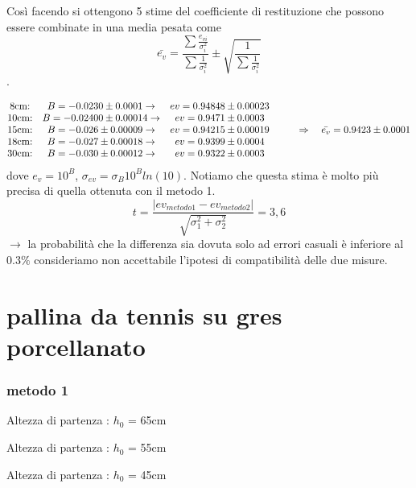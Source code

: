 \documentclass[a4paper]{article}
\theoremstyle{definition}
\begin{document}
	\noindent Così facendo si ottengono 5 stime del coefficiente di restituzione che possono essere combinate in una media pesata come \[\bar{e_{v}}=\frac{\sum\frac{e_{vi}}{\sigma_{i}^{2}}}{\sum\frac{1}{\sigma _{i}^{2}}} \pm \sqrt{\frac{1}{\sum \frac{1}{\sigma _{i}^{2}}}}\].
	
	\[\begin{matrix}
		$8cm:$ & $\(B = -0.0230 \pm 0.0001 \rightarrow\)$&$\(ev = 0.94848\pm0.00023\)$ &  \\ 
		$10cm:$ & $\(B = -0.02400\pm 0.00014\rightarrow\)$& $\(ev =0.9471 \pm 0.0003\)$ &  \\ 
		$15cm:$ & $\(B=-0.026 \pm 0.00009\rightarrow\)$&$\(ev = 0.94215\pm0.00019\)$ & $\(\qquad \Rightarrow \quad \bar{e_{v}} = 0.9423 \pm 0.0001\)$\\ 
		$18cm:$ & $\(B=-0.027\pm 0.00018\rightarrow\)$& $\(ev = 0.9399\pm0.0004\)$ &  \\ 
		$30cm:$ & $\(B=-0.030\pm 0.00012\rightarrow\)$&$\(ev =  0.9322\pm0.0003\)$ & 
	\end{matrix}\]
	dove \(e_{v}= 10^{B}\), \(\sigma_{ev} = \sigma_{B}10^{B}ln(10)\). Notiamo che questa stima è molto più precisa di quella ottenuta con il metodo 1.\\
	\[t = \frac{ \left |ev_{metodo1}  - ev_{metodo2} \right |}{\sqrt{\sigma_{1}^{2}+ \sigma_{2}^{2}}} = 3,6  \]
	\noindent \(\rightarrow\) la probabilità che la differenza sia dovuta solo ad errori casuali è inferiore al 0.3\(\%\) consideriamo non accettabile l'ipotesi di compatibilità delle due misure.
	\section*{pallina da tennis su gres porcellanato}
	\subsubsection*{metodo 1}
	Altezza di partenza : \(h_{0}\) = 65cm
	
	\begin{table}[!ht]
		\centering
		
	\end{table}
		\noindent Altezza di partenza : \(h_{0}\) = 55cm
		
	\begin{table}[!ht]
		\centering
		
	\end{table}
	\noindent	Altezza di partenza : \(h_{0}\) = 45cm
		
\end{document}
